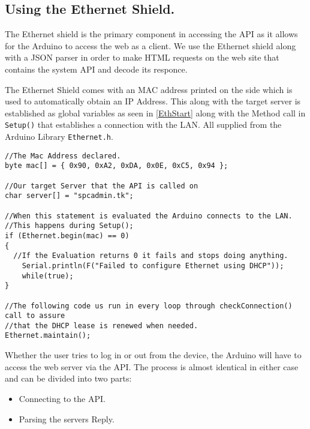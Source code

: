 \subsection{Using the Ethernet Shield.}
\label{sec:ethernetshield}
The Ethernet shield is the primary component in accessing the API as it allows for the Arduino to access the web as a client.
We use the Ethernet shield along with a JSON parser in order to make HTML requests on the web site that contains the system API and decode its responce.

The Ethernet Shield comes with an MAC address printed on the side which is used to automatically obtain an IP Address.
This along with the target server is established as global variables as seen in \autoref{EthStart} along with the Method call in \verb|Setup()| that establishes a connection with the LAN. All supplied from the Arduino Library \verb|Ethernet.h|.

\begin{lstlisting}[frame=single, label=EthStart, caption=The Method Calls used to establish and maintain a connection.]
//The Mac Address declared.
byte mac[] = { 0x90, 0xA2, 0xDA, 0x0E, 0xC5, 0x94 };

//Our target Server that the API is called on
char server[] = "spcadmin.tk";

//When this statement is evaluated the Arduino connects to the LAN.
//This happens during Setup();
if (Ethernet.begin(mac) == 0) 
{
  //If the Evaluation returns 0 it fails and stops doing anything.
	Serial.println(F("Failed to configure Ethernet using DHCP"));
	while(true); 
}

//The following code us run in every loop through checkConnection() call to assure
//that the DHCP lease is renewed when needed.
Ethernet.maintain();
\end{lstlisting}

Whether the user tries to log in or out from the device, the Arduino will have to access the web server via the API.
The process is almost identical in either case and can be divided into two parts:
\begin{itemize}
	\item Connecting to the API.
	\item Parsing the servers Reply.
\end{itemize}

